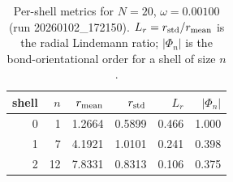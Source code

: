 \begin{table}[t]
\centering
\small
\setlength{\tabcolsep}{4pt}
\renewcommand{\arraystretch}{1.15}
\begin{tabular}{r r r r r r}
\toprule
shell & $n$ & $r_{\rm mean}$ & $r_{\rm std}$ & $L_r$ & $|\Phi_n|$ \\
\midrule
0 & 1 & 1.2664 & 0.5899 & 0.466 & 1.000 \\
1 & 7 & 4.1921 & 1.0101 & 0.241 & 0.398 \\
2 & 12 & 7.8331 & 0.8313 & 0.106 & 0.375 \\
\bottomrule
\end{tabular}
\caption{Per-shell metrics for $N=20$, $\omega=0.00100$ (run 20260102_172150). $L_r=r_{\rm std}/r_{\rm mean}$ is the radial Lindemann ratio; $|\Phi_n|$ is the bond-orientational order for a shell of size $n$.}
\end{table}